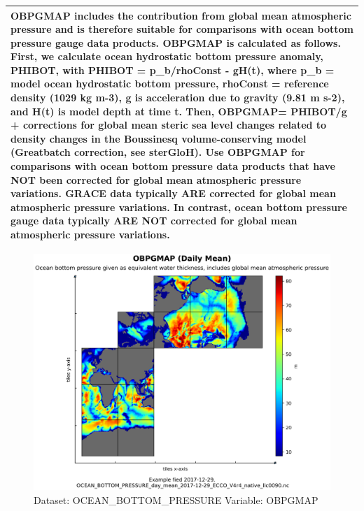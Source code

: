 \begin{longtable}{|m{}|m{}|m{}|m{}|}
\multicolumn{4}{|p{1\textwidth}|}{OBPGMAP includes the contribution from global mean atmospheric pressure and is therefore suitable for comparisons with ocean bottom pressure gauge data products. OBPGMAP is calculated as follows. First, we calculate ocean hydrostatic bottom pressure anomaly, PHIBOT, with PHIBOT = p\_b/rhoConst - gH(t), where p\_b = model ocean hydrostatic bottom pressure, rhoConst = reference density (1029 kg m-3), g is acceleration due to gravity (9.81 m s-2), and H(t) is model depth at time t. Then, OBPGMAP= PHIBOT/g + corrections for global mean steric sea level changes related to density changes in the Boussinesq volume-conserving model (Greatbatch correction, see sterGloH). Use OBPGMAP for comparisons with ocean bottom pressure data products that have NOT been corrected for global mean atmospheric pressure variations. GRACE data typically ARE corrected for global mean atmospheric pressure variations. In contrast, ocean bottom pressure gauge data typically ARE NOT corrected for global mean atmospheric pressure variations.} \\ \hline
\end{longtable}

\begin{figure}[H]
\centering
\includegraphics[scale=0.55]{../images/plots/native_plots/Ocean_Bottom_Pressure/OBPGMAP.png}
\caption{Dataset: OCEAN\_BOTTOM\_PRESSURE Variable: OBPGMAP}
\label{tab:table-OCEAN_BOTTOM_PRESSURE_OBPGMAP-Plot}
\end{figure}
\pagebreak
